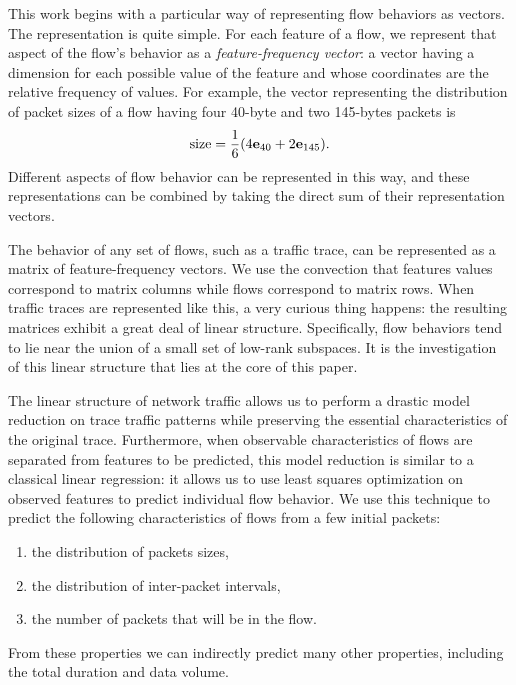 \documentclass[conference]{IEEEtran}
\begin{document}
This work begins with a particular way of representing flow behaviors as vectors.
The representation is quite simple.
For each feature of a flow, we represent that aspect of the flow's behavior as a \emph{feature-frequency vector}:
a vector having a dimension for each possible value of the feature and whose coordinates are the relative frequency of values.
For example, the vector representing the distribution of packet sizes of a flow having four 40-byte and two 145-bytes packets is
\begin{align}
  \text{size} = \frac{1}{6}{\left(4\mathbf{e}_{40} + 2\mathbf{e}_{145}\right)}.
\end{align}
Different aspects of flow behavior can be represented in this way, and these representations can be combined by taking the direct sum of their representation vectors.

The behavior of any set of flows, such as a traffic trace, can be represented as a matrix of feature-frequency vectors.
We use the convection that features values correspond to matrix columns while flows correspond to matrix rows.
When traffic traces are represented like this, a very curious thing happens:
the resulting matrices exhibit a great deal of linear structure.
Specifically, flow behaviors tend to lie near the union of a small set of low-rank subspaces.
It is the investigation of this linear structure that lies at the core of this paper.

The linear structure of network traffic allows us to perform a drastic model reduction on trace traffic patterns while preserving the essential characteristics of the original trace.
Furthermore, when observable characteristics of flows are separated from features to be predicted, this model reduction is similar to a classical linear regression:
it allows us to use least squares optimization on observed features to predict individual flow behavior.
We use this technique to predict the following characteristics of flows from a few initial packets:
\begin{enumerate}
  \item the distribution of packets sizes,
  \item the distribution of inter-packet intervals,
  \item the number of packets that will be in the flow.
\end{enumerate}
From these properties we can indirectly predict many other properties, including the total duration and data volume.
\end{document}
